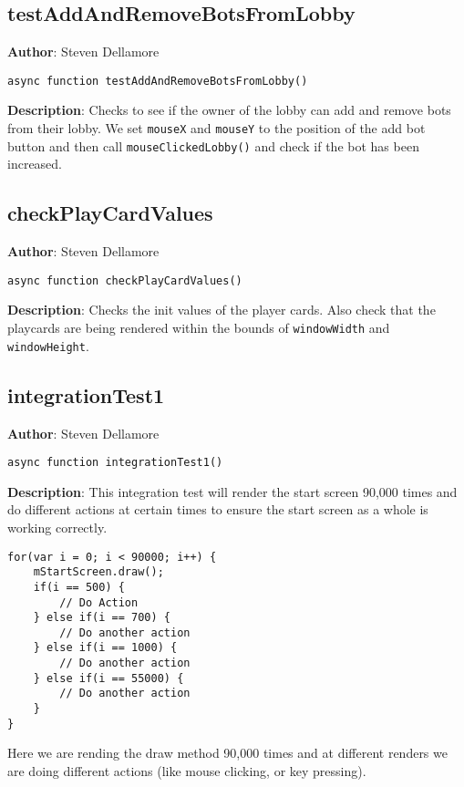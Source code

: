 \documentclass[12pt]{article}
\begin{document}
\subsection{testAddAndRemoveBotsFromLobby}
\textbf{Author}: Steven Dellamore 
\vspace*{1\baselineskip}
\begin{lstlisting}
async function testAddAndRemoveBotsFromLobby()
\end{lstlisting} 
\vspace*{1\baselineskip}
\textbf{Description}: Checks to see if the owner of the lobby can add and remove bots from their lobby. We set \texttt{mouseX} and \texttt{mouseY} to the position of the add bot button and then call \texttt{mouseClickedLobby()} and check if the bot has been increased. 



\subsection{checkPlayCardValues}
\textbf{Author}: Steven Dellamore 
\vspace*{1\baselineskip}
\begin{lstlisting}
async function checkPlayCardValues()
\end{lstlisting} 
\vspace*{1\baselineskip}
\textbf{Description}: Checks the init values of the player cards. Also check that the playcards are being rendered within the bounds of \texttt{windowWidth} and \texttt{windowHeight}. 



\subsection{integrationTest1}
\textbf{Author}: Steven Dellamore 
\vspace*{1\baselineskip}
\begin{lstlisting}
async function integrationTest1()
\end{lstlisting} 
\vspace*{1\baselineskip}
\textbf{Description}: This integration test will render the start screen 90,000 times and do different actions at certain times to ensure the start screen as a whole is working correctly. 
\begin{verbatim}
for(var i = 0; i < 90000; i++) {
    mStartScreen.draw();
    if(i == 500) { 
        // Do Action
    } else if(i == 700) { 
        // Do another action
    } else if(i == 1000) { 
        // Do another action
    } else if(i == 55000) { 
        // Do another action
    }
}
\end{verbatim}
 Here we are rending the draw method 90,000 times and at different renders we are doing different actions (like mouse clicking, or key pressing). 
\end{document}
